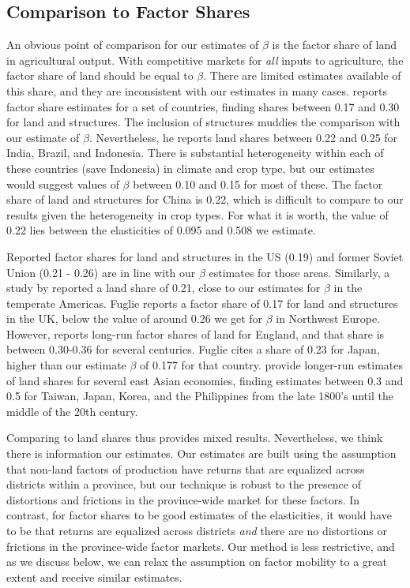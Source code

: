 \documentclass[11pt]{article}
\begin{document}
\subsection{Comparison to Factor Shares}
An obvious point of comparison for our estimates of $\beta$ is the factor share of land in agricultural output. With competitive markets for \textit{all} inputs to agriculture, the factor share of land should be equal to $\beta$. There are limited estimates available of this share, and they are inconsistent with our estimates in many cases. \citet{fuglie2010} reports factor share estimates for a set of countries, finding shares between 0.17 and 0.30 for land and structures. The inclusion of structures muddies the comparison with our estimate of $\beta$. Nevertheless, he reports land shares between 0.22 and 0.25 for India, Brazil, and Indonesia. There is substantial heterogeneity within each of these countries (save Indonesia) in climate and crop type, but our estimates would suggest values of $\beta$ between 0.10 and 0.15 for most of these. The factor share of land and structures for China is 0.22, which is difficult to compare to our results given the heterogeneity in crop types. For what it is worth, the value of 0.22 lies between the elasticities of 0.095 and 0.508 we estimate.

Reported factor shares for land and structures in the US (0.19) and former Soviet Union (0.21 - 0.26) are in line with our $\beta$ estimates for those areas. Similarly, a study by \citet{jg1992} reported a land share of 0.21, close to our estimates for $\beta$ in the temperate Americas. Fuglie reports a factor share of 0.17 for land and structures in the UK, below the value of around 0.26 we get for $\beta$ in Northwest Europe. However, \citet{Clark2002} reports long-run factor shares of land for England, and that share is between 0.30-0.36 for several centuries. Fuglie cites a share of 0.23 for Japan, higher than our estimate $\beta$ of 0.177 for that country. \citet{hrs1979} provide longer-run estimates of land shares for several east Asian economies, finding estimates between 0.3 and 0.5 for Taiwan, Japan, Korea, and the Philippines from the late 1800's until the middle of the 20th century.

Comparing to land shares thus provides mixed results. Nevertheless, we think there is information our estimates. Our estimates are built using the assumption that non-land factors of production have returns that are equalized across districts within a province, but our technique is robust to the presence of distortions and frictions in the province-wide market for these factors. In contrast, for factor shares to be good estimates of the elasticities, it would have to be that returns are equalized across districts \textit{and} there are no distortions or frictions in the province-wide factor markets. Our method is less restrictive, and as we discuss below, we can relax the assumption on factor mobility to a great extent and receive similar estimates. 
\end{document}
